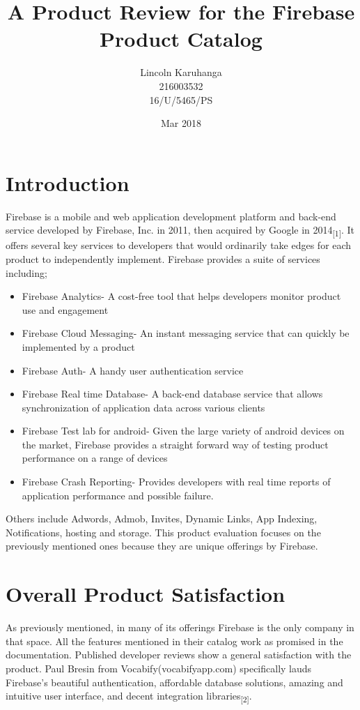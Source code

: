 \documentclass{article}
\title{A Product Review for the Firebase Product Catalog}
\author{Lincoln Karuhanga \\ 216003532 \\ 16/U/5465/PS}
\date{Mar 2018}
\begin{document}
\maketitle

\newpage

\section{Introduction}
Firebase is a mobile and web application development platform and back-end service developed by Firebase, Inc. in 2011, then acquired by Google in 2014\textsubscript{[1]}. It offers several key services to developers that would ordinarily take edges for each product to independently implement. Firebase provides a suite of services including;
\begin{itemize}
    \item Firebase Analytics- A cost-free tool that helps developers monitor product use and engagement
    \item Firebase Cloud Messaging- An instant messaging service that can quickly be implemented by a product
    \item Firebase Auth- A handy user authentication service
    \item Firebase Real time Database- A back-end database service that allows synchronization of application data across various clients
    \item Firebase Test lab for android- Given the large variety of android devices on the market, Firebase provides a straight forward way of testing product performance on a range of devices
    \item Firebase Crash Reporting- Provides developers with real time reports of application performance and possible failure.
\end{itemize}
Others include Adwords, Admob, Invites, Dynamic Links, App Indexing, Notifications, hosting and  storage. This product evaluation focuses on the previously mentioned ones because they are unique offerings by Firebase.

\section{Overall Product Satisfaction}
As previously mentioned, in many of its offerings Firebase is the only company in that space. All the features mentioned in their catalog work as promised in the documentation.
Published developer reviews show a general satisfaction with the product. Paul Bresin from Vocabify(vocabifyapp.com) specifically lauds Firebase’s beautiful authentication, affordable database solutions, amazing and intuitive user interface, and decent integration libraries\textsubscript{[2]}.
\end{document}
